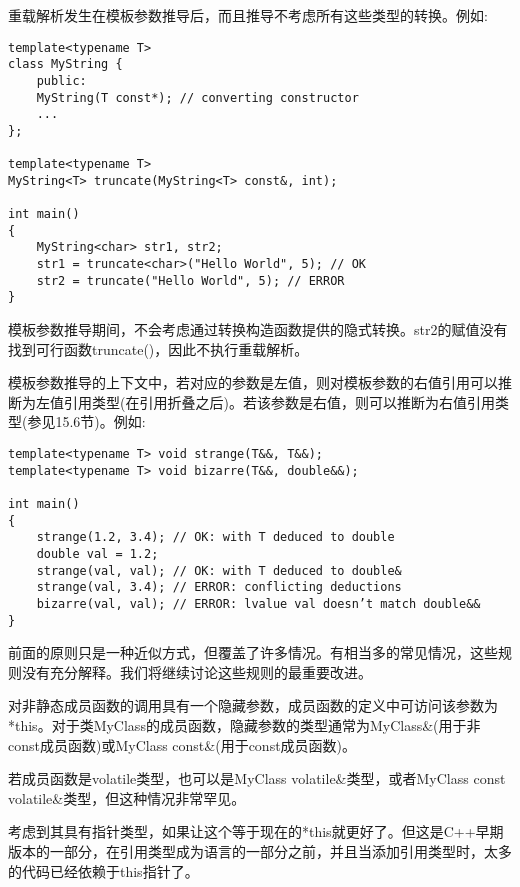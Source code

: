 重载解析发生在模板参数推导后，而且推导不考虑所有这些类型的转换。例如:

\begin{lstlisting}[style=styleCXX]
template<typename T>
class MyString {
	public:
	MyString(T const*); // converting constructor
	...
};

template<typename T>
MyString<T> truncate(MyString<T> const&, int);

int main()
{
	MyString<char> str1, str2;
	str1 = truncate<char>("Hello World", 5); // OK
	str2 = truncate("Hello World", 5); // ERROR
}
\end{lstlisting}

模板参数推导期间，不会考虑通过转换构造函数提供的隐式转换。str2的赋值没有找到可行函数truncate()，因此不执行重载解析。

模板参数推导的上下文中，若对应的参数是左值，则对模板参数的右值引用可以推断为左值引用类型(在引用折叠之后)。若该参数是右值，则可以推断为右值引用类型(参见15.6节)。例如:

\begin{lstlisting}[style=styleCXX]
template<typename T> void strange(T&&, T&&);
template<typename T> void bizarre(T&&, double&&);

int main()
{
	strange(1.2, 3.4); // OK: with T deduced to double
	double val = 1.2;
	strange(val, val); // OK: with T deduced to double&
	strange(val, 3.4); // ERROR: conflicting deductions
	bizarre(val, val); // ERROR: lvalue val doesn’t match double&&
}
\end{lstlisting}

前面的原则只是一种近似方式，但覆盖了许多情况。有相当多的常见情况，这些规则没有充分解释。我们将继续讨论这些规则的最重要改进。


对非静态成员函数的调用具有一个隐藏参数，成员函数的定义中可访问该参数为*this。对于类MyClass的成员函数，隐藏参数的类型通常为MyClass\&(用于非const成员函数)或MyClass const\&(用于const成员函数)。

\begin{tcolorbox}[colback=webgreen!5!white,colframe=webgreen!75!black]
\hspace*{0.75cm}若成员函数是volatile类型，也可以是MyClass volatile\&类型，或者MyClass const volatile\&类型，但这种情况非常罕见。
\end{tcolorbox}

考虑到其具有指针类型，如果让这个等于现在的*this就更好了。但这是C++早期版本的一部分，在引用类型成为语言的一部分之前，并且当添加引用类型时，太多的代码已经依赖于this指针了。


